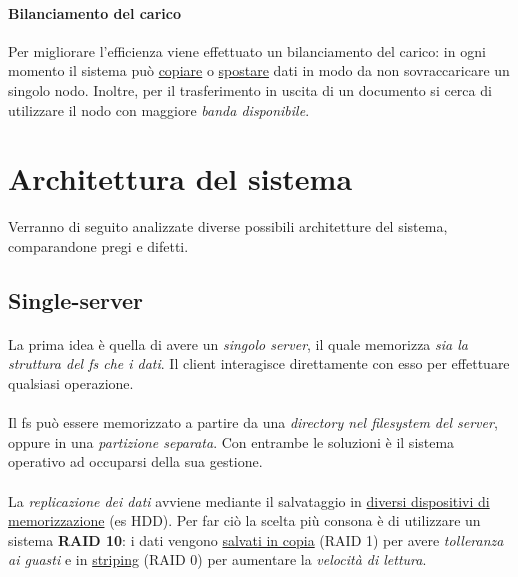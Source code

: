 \documentclass[11pt,a4paper,english]{article}
\begin{document}
\paragraph{Bilanciamento del carico} Per migliorare l'efficienza viene effettuato un bilanciamento del carico: in ogni momento il sistema può \underline{copiare} o \underline{spostare} dati in modo da non sovraccaricare un singolo nodo. Inoltre, per il trasferimento in uscita di un documento si cerca di utilizzare il nodo con maggiore \emph{banda disponibile}. 



\section{Architettura del sistema}

Verranno di seguito analizzate diverse possibili architetture del sistema, comparandone pregi e difetti. 

\subsection{Single-server}

\paragraph{} La prima idea è quella di avere un \emph{singolo server}, il quale memorizza \emph{sia la struttura del fs che i dati}. Il client interagisce direttamente con esso per effettuare qualsiasi operazione. 

\paragraph{} Il fs può essere memorizzato a partire da una \emph{directory nel filesystem del server}, oppure in una \emph{partizione separata}. Con entrambe le soluzioni è il sistema operativo ad occuparsi della sua gestione.

\paragraph{} La \emph{replicazione dei dati} avviene mediante il salvataggio in \underline{diversi dispositivi di memorizzazione} (es HDD). Per far ciò la scelta più consona è di utilizzare un sistema \textbf{RAID 10}\cite{raid}: i dati vengono \underline{salvati in copia} (RAID 1) per avere \emph{tolleranza ai guasti} e in \underline{striping} (RAID 0) per aumentare la \emph{velocità di lettura}. 
\end{document}
